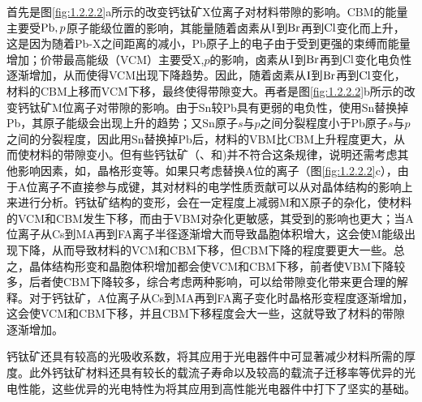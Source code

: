 \documentclass[forlib]{WHUMaster}   %
\begin{document}
{首先是图\ref{fig:1.2.2.2}a所示的改变钙钛矿X位离子对材料带隙的影响。CBM的能量主要受${\rm{Pb}},p$原子能级位置的影响，其能量随着卤素从$\rm{I}$到$\rm{Br}$再到$\rm{Cl}$变化而上升，这是因为随着Pb-X之间距离的减小，Pb原子上的电子由于受到更强的束缚而能量增加；价带最高能级（VCM）主要受X,$p$的影响，卤素从$\rm{I}$到$\rm{Br}$再到$\rm{Cl}$变化电负性逐渐增加，从而使得VCM出现下降趋势。因此，随着卤素从$\rm{I}$到$\rm{Br}$再到$\rm{Cl}$变化，材料的CBM上移而VCM下移，最终使得带隙变大。再者是图\ref{fig:1.2.2.2}b所示的改变钙钛矿M位离子对带隙的影响。由于Sn较Pb具有更弱的电负性，使用Sn替换掉Pb，其原子能级会出现上升的趋势；又Sn原子$s$与$p$之间分裂程度小于Pb原子$s$与$p$之间的分裂程度，因此用Sn替换掉Pb后，材料的VBM比CBM上升程度更大，从而使材料的带隙变小。但有些钙钛矿（、和)并不符合这条规律，说明还需考虑其他影响因素，如，晶格形变等。如果只考虑替换A位的离子（图\ref{fig:1.2.2.2}c），由于A位离子不直接参与成键，其对材料的电学性质贡献可以从对晶体结构的影响上来进行分析。钙钛矿结构的变形，会在一定程度上减弱M和X原子的杂化，使材料的VCM和CBM发生下移，而由于VBM对杂化更敏感，其受到的影响也更大；当A位离子从Cs到MA再到FA离子半径逐渐增大而导致晶胞体积增大，这会使M能级出现下降，从而导致材料的VCM和CBM下移，但CBM下降的程度要更大一些。总之，晶体结构形变和晶胞体积增加都会使VCM和CBM下移，前者使VBM下降较多，后者使CBM下降较多，综合考虑两种影响，可以给带隙变化带来更合理的解释。对于钙钛矿，A位离子从Cs到MA再到FA离子变化时晶格形变程度逐渐增加，这会使VCM和CBM下移，并且CBM下移程度会大一些，这就导致了材料的带隙逐渐增加。\iffalse 显然，可以同时调节A位、B位以及X位的离子组分来制备合适带隙的钙钛矿材料，材料带隙调节的灵活性大大增加了钙钛矿材料的应用范围。\fi

钙钛矿还具有较高的光吸收系数，将其应用于光电器件中可显著减少材料所需的厚度\cite{RN52,RN47}。此外钙钛矿材料还具有较长的载流子寿命\cite{RN48}以及较高的载流子迁移率\cite{RN49,RN50}等优异的光电性能，这些优异的光电特性为将其应用到高性能光电器件中打下了坚实的基础。}


\end{document}
